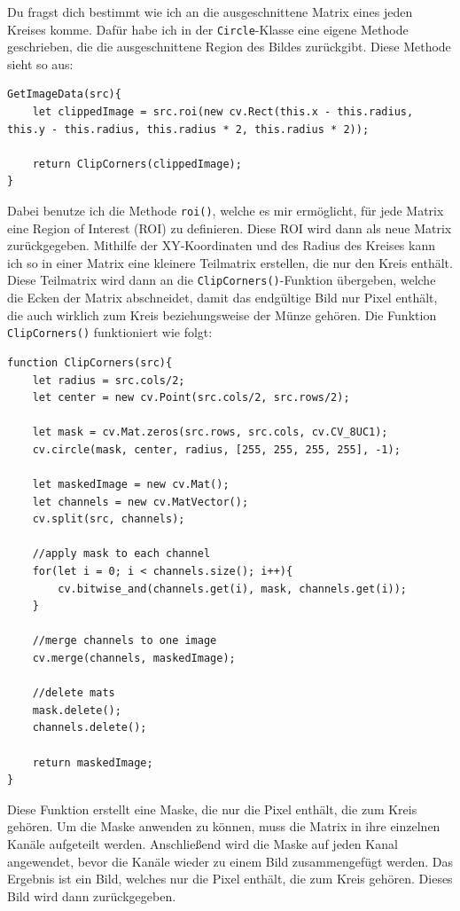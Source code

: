 Du fragst dich bestimmt wie ich an die ausgeschnittene Matrix eines jeden Kreises komme. Dafür habe ich in der \texttt{Circle}-Klasse eine eigene Methode geschrieben, die die ausgeschnittene Region des Bildes zurückgibt. Diese Methode sieht so aus:

\begin{lstlisting}[style=JavaScript]
GetImageData(src){
    let clippedImage = src.roi(new cv.Rect(this.x - this.radius, this.y - this.radius, this.radius * 2, this.radius * 2));

    return ClipCorners(clippedImage);
}
\end{lstlisting}

Dabei benutze ich die Methode \texttt{roi()}, welche es mir ermöglicht, für jede Matrix eine Region of Interest (ROI) zu definieren. Diese ROI wird dann als neue Matrix zurückgegeben. Mithilfe der XY-Koordinaten und des Radius des Kreises kann ich so in einer Matrix eine kleinere Teilmatrix erstellen, die nur den Kreis enthält. Diese Teilmatrix wird dann an die \texttt{ClipCorners()}-Funktion übergeben, welche die Ecken der Matrix abschneidet, damit das endgültige Bild nur Pixel enthält, die auch wirklich zum Kreis beziehungsweise der Münze gehören. Die Funktion \texttt{ClipCorners()} funktioniert wie folgt:

\begin{lstlisting}[style=JavaScript]
function ClipCorners(src){
    let radius = src.cols/2;
    let center = new cv.Point(src.cols/2, src.rows/2);

    let mask = cv.Mat.zeros(src.rows, src.cols, cv.CV_8UC1);
    cv.circle(mask, center, radius, [255, 255, 255, 255], -1);

    let maskedImage = new cv.Mat();
    let channels = new cv.MatVector();
    cv.split(src, channels);

    //apply mask to each channel
    for(let i = 0; i < channels.size(); i++){
        cv.bitwise_and(channels.get(i), mask, channels.get(i));
    }

    //merge channels to one image
    cv.merge(channels, maskedImage);

    //delete mats
    mask.delete();
    channels.delete();

    return maskedImage;
}
\end{lstlisting}

Diese Funktion erstellt eine Maske, die nur die Pixel enthält, die zum Kreis gehören. Um die Maske anwenden zu können, muss die Matrix in ihre einzelnen Kanäle aufgeteilt werden. Anschließend wird die Maske auf jeden Kanal angewendet, bevor die Kanäle wieder zu einem Bild zusammengefügt werden. Das Ergebnis ist ein Bild, welches nur die Pixel enthält, die zum Kreis gehören. Dieses Bild wird dann zurückgegeben.

